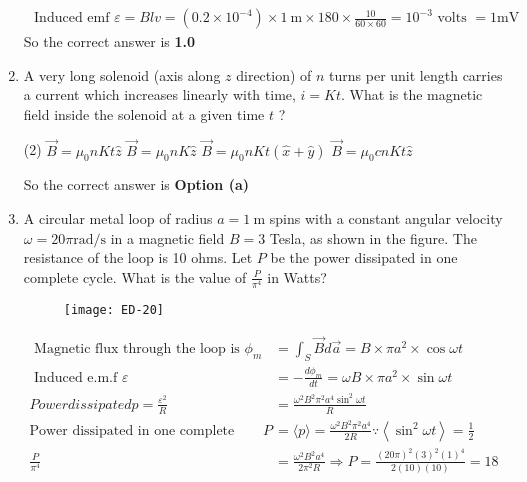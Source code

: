 \begin{enumerate}
	{}
	\begin{answer}
		\begin{align*}
		\text { Induced emf } \varepsilon=B l v=\left(0.2 \times 10^{-4}\right) \times 1 \mathrm{~m} \times 180 \times \frac{10}{60 \times 60}=10^{-3} \text { volts }=1 \mathrm{mV}
		\end{align*}
			So the correct answer is \textbf{1.0}
	\end{answer}
	\item 	A very long solenoid (axis along $z$ direction) of $n$ turns per unit length carries a current which increases linearly with time, $i=K t$. What is the magnetic field inside the solenoid at a given time $t$ ?
	{}
	\begin{tasks}(2)
		\task[\textbf{a.}]$\vec{B}=\mu_{0} n K t \hat{z}$
		\task[\textbf{b.}]$\vec{B}=\mu_{0} n K \hat{z}$
		\task[\textbf{c.}]$\vec{B}=\mu_{0} n K t(\hat{x}+\hat{y})$
		\task[\textbf{d.}] $\vec{B}=\mu_{0} c n K t \hat{z}$
	\end{tasks}	
\begin{answer}
	So the correct answer is \textbf{Option (a)}
\end{answer}
	\item 	A circular metal loop of radius $a=1 \mathrm{~m}$ spins with a constant angular velocity $\omega=20 \pi \mathrm{rad} / \mathrm{s}$ in a magnetic field $B=3$ Tesla, as shown in the figure. The resistance of the loop is 10 ohms. Let $P$ be the power dissipated in one complete cycle. What is the value of $\frac{P}{\pi^{4}}$ in Watts?
	{}
	\begin{figure}[H]
		\centering
		\texttt{[image: ED-20]}
	\end{figure}
\begin{answer}
	\begin{align*}
	\text { Magnetic flux through the loop is } \phi_{m}&=\int_{S} \vec{B} d \vec{a}=B \times \pi a^{2} \times \cos \omega t\\
	\text { Induced e.m.f } \varepsilon&=-\frac{d \phi_{m}}{d t}=\omega B \times \pi a^{2} \times \sin \omega t\\
	Power dissipated
	p=\frac{\varepsilon^{2}}{R}&=\frac{\omega^{2} B^{2} \pi^{2} a^{4} \sin ^{2} \omega t}{R}\\
	\text{Power dissipated in one complete cycle }P&=\langle p\rangle=\frac{\omega^{2} B^{2} \pi^{2} a^{4}}{2 R}
	\because\left\langle\sin ^{2} \omega t\right\rangle=\frac{1}{2}\\
	\frac{P}{\pi^{4}}&=\frac{\omega^{2} B^{2} a^{4}}{2 \pi^{2} R} \Rightarrow P=\frac{(20 \pi)^{2}(3)^{2}(1)^{4}}{2(10)(10)}=18

\end{align*}
\end{answer}
\end{enumerate}
